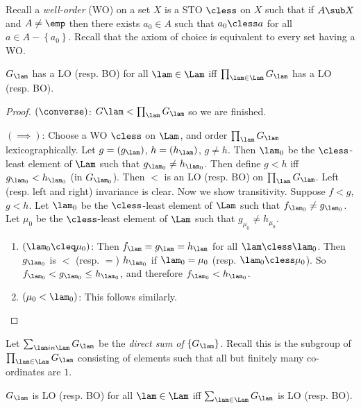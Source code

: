 Recall a \emph{well-order} (WO) on a set $X$ is a STO $\cless$ on $X$ such that if $A \sub
X$ and $A\neq \emp$ then there exists $a_0\in A$ such that $a_0 \cless a$ for all $a\in
A\minus \left\{a_0\right\}$.
Recall that the axiom of choice is equivalent to every set having a WO.

\begin{thm}
$G_\lam$ has a LO (resp. BO) for all $\lam \in \Lam$ iff $\prod_{\lam \in \Lam}G_\lam$
has a LO (resp. BO).
\label{thm:1.4}
\end{thm}

\begin{proof}
$\left(\converse\right)$: $G\lam < \prod_\lam G_\lam$ so we are finished.

$\left(\implies\right)$: Choose a WO $\cless$ on $\Lam$, and order $\prod_\lam G_\lam$
lexicographically. Let $g= \left(g_\lam\right)$, $h = \left(h_\lam\right)$, $g\neq h$.
Then $\lam_0$ be the $\cless$-least element of $\Lam$ such that $g_{\lam_0} \neq
h_{\lam_0}$. Then define $g < h$ iff $g_{\lam_0} < h_{\lam_0}$ (in $G_{\lam_0}$).
Then $<$ is an LO (resp. BO) on $\prod_\lam G_\lam$. Left (resp. left and right)
invariance is clear.
Now we show transitivity. Suppose $f < g$, $g < h$.
Let $\lam_0$ be the $\cless$-least element of $\Lam$ such that $f_{\lam_0} \neq
g_{\lam_0}$.
Let $\mu_0$ be the $\cless$-least element of $\Lam$ such that $g_{\mu_0}\neq h_{\mu_0}$.
\begin{enumerate}
\item $\left(\lam_0 \cleq \mu_0\right)$: Then $f_\lam = g_\lam = h_\lam$ for all $\lam
\cless \lam_0$.
Then $g_{\lam_0}$ is $<$ (resp. $=$) $h_{\lam_0}$ if $\lam_0 = \mu_0$ (resp. $\lam_0
\cless \mu_0$).
So $f_{\lam_0} < g_{\lam_0}\leq h_{\lam_0}$, and therefore $f_{\lam_0} < h_{\lam_0}$.

\item $\left(\mu_0 < \lam_0\right)$: This follows similarly.
\end{enumerate}
\end{proof}

Let $\sum_{\lam in \Lam} G_\lam$ be the \emph{direct sum of} $\left\{G_\lam\right\}$. Recall this
is the subgroup of $\prod_{\lam\in\Lam} G_\lam$ consisting of elements such that all but
finitely many co-ordinates are $1$.

\begin{cor}
$G_\lam$ is LO (resp. BO) for all $\lam \in \Lam$ iff $\sum_{\lam\in \Lam} G_{\lam}$ is LO
(resp. BO).
\label{cor:1.5}
\end{cor}


